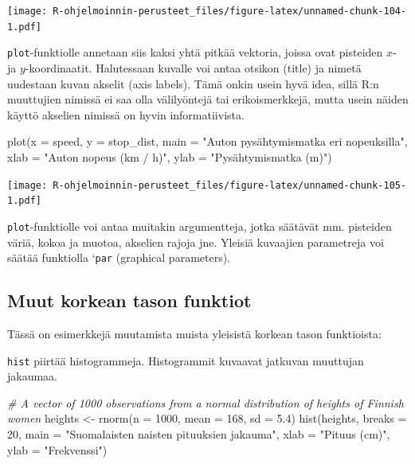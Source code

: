\documentclass[
]{book}
\newenvironment{Shaded}{\begin{snugshade}}{\end{snugshade}}
\newcommand{\AttributeTok}[1]{\textcolor[rgb]{0.77,0.63,0.00}{#1}}
\newcommand{\CommentTok}[1]{\textcolor[rgb]{0.56,0.35,0.01}{\textit{#1}}}
\newcommand{\DecValTok}[1]{\textcolor[rgb]{0.00,0.00,0.81}{#1}}
\newcommand{\FloatTok}[1]{\textcolor[rgb]{0.00,0.00,0.81}{#1}}
\newcommand{\FunctionTok}[1]{\textcolor[rgb]{0.00,0.00,0.00}{#1}}
\newcommand{\NormalTok}[1]{#1}
\newcommand{\OtherTok}[1]{\textcolor[rgb]{0.56,0.35,0.01}{#1}}
\newcommand{\StringTok}[1]{\textcolor[rgb]{0.31,0.60,0.02}{#1}}
\begin{document}
\texttt{[image: R-ohjelmoinnin-perusteet\_files/figure-latex/unnamed-chunk-104-1.pdf]}

\texttt{plot}-funktiolle annetaan siis kaksi yhtä pitkää vektoria, joissa ovat pisteiden \(x\)- ja \(y\)-koordinaatit. Halutessaan kuvalle voi antaa otsikon (title) ja nimetä uudestaan kuvan akselit (axis labels). Tämä onkin usein hyvä idea, sillä R:n muuttujien nimissä ei saa olla välilyöntejä tai erikoismerkkejä, mutta usein näiden käyttö akselien nimissä on hyvin informatiivista.

\begin{Shaded}
\begin{Highlighting}[]
\FunctionTok{plot}\NormalTok{(}\AttributeTok{x =}\NormalTok{ speed, }\AttributeTok{y =}\NormalTok{ stop\_dist,}
     \AttributeTok{main =} \StringTok{"Auton pysähtymismatka eri nopeuksilla"}\NormalTok{,}
     \AttributeTok{xlab =} \StringTok{"Auton nopeus (km / h)"}\NormalTok{, }\AttributeTok{ylab =} \StringTok{"Pysähtymismatka (m)"}\NormalTok{)}
\end{Highlighting}
\end{Shaded}

\texttt{[image: R-ohjelmoinnin-perusteet\_files/figure-latex/unnamed-chunk-105-1.pdf]}

\texttt{plot}-funktiolle voi antaa muitakin argumentteja, jotka säätävät mm. pisteiden väriä, kokoa ja muotoa, akselien rajoja jne. Yleisiä kuvaajien parametreja voi säätää funktiolla `\texttt{par} (graphical parameters).

\hypertarget{muut-korkean-tason-funktiot}{%
\subsection{Muut korkean tason funktiot}\label{muut-korkean-tason-funktiot}}

Tässä on esimerkkejä muutamista muista yleisistä korkean tason funktioista:

\texttt{hist} piirtää histogrammeja. Histogrammit kuvaavat jatkuvan muuttujan jakaumaa.

\begin{Shaded}
\begin{Highlighting}[]
\CommentTok{\# A vector of 1000 observations from a normal distribution of heights of Finnish women}
\NormalTok{heights }\OtherTok{\textless{}{-}} \FunctionTok{rnorm}\NormalTok{(}\AttributeTok{n =} \DecValTok{1000}\NormalTok{, }\AttributeTok{mean =} \DecValTok{168}\NormalTok{, }\AttributeTok{sd =} \FloatTok{5.4}\NormalTok{)}
\FunctionTok{hist}\NormalTok{(heights, }\AttributeTok{breaks =} \DecValTok{20}\NormalTok{, }
     \AttributeTok{main =} \StringTok{"Suomalaisten naisten pituuksien jakauma"}\NormalTok{,}
     \AttributeTok{xlab =} \StringTok{"Pituus (cm)"}\NormalTok{, }\AttributeTok{ylab =} \StringTok{"Frekvenssi"}\NormalTok{)}
\end{Highlighting}
\end{Shaded}
\end{document}
